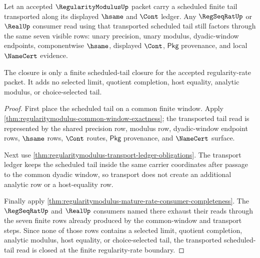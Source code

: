 \begin{theorem}
\label{thm:regularitymodulus-scheduled-tail-closure}
Let an accepted $\RegularityModulusUp$ packet carry a scheduled finite tail
transported along its displayed $\hsame$ and $\Cont$ ledger. Any $\RegSeqRatUp$
or $\RealUp$ consumer read using that transported scheduled tail still factors
through the same seven visible rows: unary precision, unary modulus,
dyadic-window endpoints, componentwise $\hsame$, displayed $\Cont$,
$\mathsf{Pkg}$ provenance, and local $\NameCert$ evidence.

The closure is only a finite scheduled-tail closure for the accepted
regularity-rate packet. It adds no selected limit, quotient completion, host
equality, analytic modulus, or choice-selected tail.
\end{theorem}
\begin{proof}
First place the scheduled tail on a common finite window. Apply
\autoref{thm:regularitymodulus-common-window-exactness}; the transported tail
read is represented by the shared precision row, modulus row, dyadic-window
endpoint rows, $\hsame$ rows, $\Cont$ routes, $\mathsf{Pkg}$ provenance, and
$\NameCert$ surface.

Next use \autoref{thm:regularitymodulus-transport-ledger-obligations}. The
transport ledger keeps the scheduled tail inside the same carrier coordinates
after passage to the common dyadic window, so transport does not create an
additional analytic row or a host-equality row.

Finally apply
\autoref{thm:regularitymodulus-mature-rate-consumer-completeness}. The
$\RegSeqRatUp$ and $\RealUp$ consumers named there exhaust their reads through
the seven finite rows already produced by the common-window and transport
steps. Since none of those rows contains a selected limit, quotient completion,
analytic modulus, host equality, or choice-selected tail, the transported
scheduled-tail read is closed at the finite regularity-rate boundary.
\end{proof}

